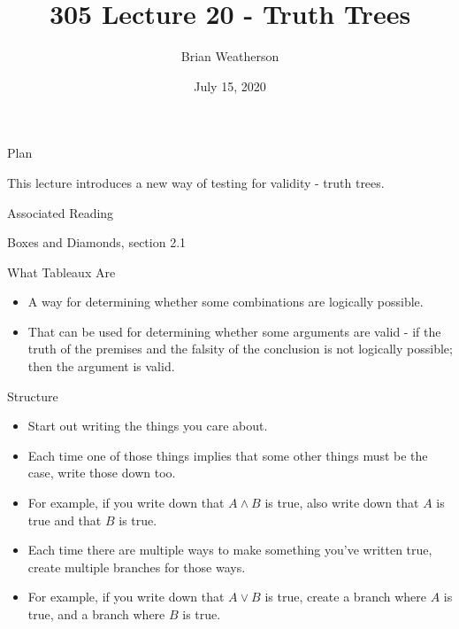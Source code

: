 \documentclass[
  ignorenonframetext,
]{beamer}
\title{305 Lecture 20 - Truth Trees}
\author{Brian Weatherson}
\date{July 15, 2020}
\providecommand{\tightlist}{%
  \setlength{\itemsep}{0pt}\setlength{\parskip}{0pt}}
\renewcommand{\,}{\text{, }}
\begin{document}
\frame{\titlepage}

\begin{frame}{Plan}
\protect\hypertarget{plan}{}

This lecture introduces a new way of testing for validity - truth trees.

\end{frame}

\begin{frame}{Associated Reading}
\protect\hypertarget{associated-reading}{}

Boxes and Diamonds, section 2.1

\end{frame}

\begin{frame}{What Tableaux Are}
\protect\hypertarget{what-tableaux-are}{}

\begin{itemize}
\tightlist
\item
  A way for determining whether some combinations are logically
  possible.
\item
  That can be used for determining whether some arguments are valid - if
  the truth of the premises and the falsity of the conclusion is not
  logically possible; then the argument is valid.
\end{itemize}

\end{frame}

\begin{frame}{Structure}
\protect\hypertarget{structure}{}

\begin{itemize}
\tightlist
\item
  Start out writing the things you care about.\pause
\item
  Each time one of those things implies that some other things must be
  the case, write those down too.
\item
  For example, if you write down that \(A \wedge B\) is true, also write
  down that \(A\) is true and that \(B\) is true. \pause
\item
  Each time there are multiple ways to make something you've written
  true, create multiple branches for those ways.
\item
  For example, if you write down that \(A \vee B\) is true, create a
  branch where \(A\) is true, and a branch where \(B\) is true.
\end{itemize}

\end{frame}
\end{document}
